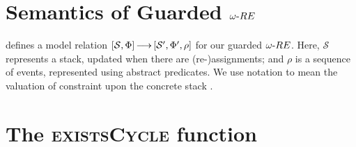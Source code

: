\documentclass[acmsmall,screen,review,anonymous,nonacm]{acmart}
\begin{document}
\section{Semantics of Guarded ${\omega\text{-}RE}$}
\label{appsec:Semantics_wre}


 defines a model relation  
$[\mathcal{S}, {\mathrm{\Phi}}] \,{\longrightarrow}\, [\mathcal{S}^\prime, {\mathrm{\Phi}}^\prime, \rho]$ for our guarded ${\omega\text{-}RE}$. Here, $\mathcal{S}$ represents a stack, updated when there are (re-)assignments; and 
$\rho$ is a sequence of events, represented using abstract predicates. 
We use notation  to mean the valuation of constraint \code{\pi} upon the concrete stack . 



\section{The \textsc{existsCycle} function}
\label{appsec:existsCycle}
\end{document}
